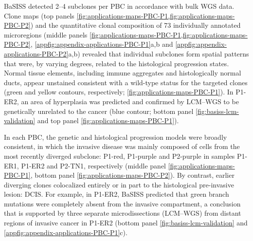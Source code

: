 
\ac{BaSISS} detected 2–4 subclones per \ac{PBC} in accordance with bulk \ac{WGS} data. Clone maps (top panels \cref{fig:applications-maps-PBC-P1,fig:applications-maps-PBC-P2}) and the quantitative clonal composition of 73 individually annotated microregions (middle panels \cref{fig:applications-maps-PBC-P1,fig:applications-maps-PBC-P2}, \cref{appfig:appendix-applications-PBC-P1}a,b and \cref{appfig:appendix-applications-PBC-P2}a,b) revealed that individual subclones form spatial patterns that were, by varying degrees, related to the histological progression states. Normal tissue elements, including immune aggregates and histologically normal ducts, appear unstained consistent with a wild-type status for the targeted clones (green and yellow contours, respectively; \cref{fig:applications-maps-PBC-P1}). In P1-ER2, an area of hyperplasia was predicted and confirmed by \ac{LCM}–\ac{WGS} to be genetically unrelated to the cancer (blue contour; bottom panel \cref{fig:basiss-lcm-validation} and top panel \cref{fig:applications-maps-PBC-P1}).

In each \ac{PBC}, the genetic and histological progression models were broadly consistent, in which the invasive disease was mainly composed of cells from the most recently diverged subclone: P1-red, P1-purple and P2-purple in samples P1-ER1, P1-ER2 and P2-TN1, respectively (middle panel \cref{fig:applications-maps-PBC-P1}, bottom panel \cref{fig:applications-maps-PBC-P2}). By contrast, earlier diverging clones colocalized entirely or in part to the histological pre-invasive lesion: \ac{DCIS}. For example, in P1-ER2, \ac{BaSISS} predicted that green branch mutations were completely absent from the invasive compartment, a conclusion that is supported by three separate microdissections (\ac{LCM}–\ac{WGS}) from distant regions of invasive cancer in P1-ER2 (bottom panel \cref{fig:basiss-lcm-validation} and \cref{appfig:appendix-applications-PBC-P1}c).

